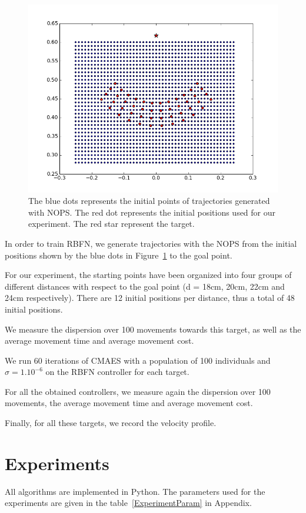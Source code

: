 \documentclass[pdftex,a4paper,11pt]{report}
\begin{document}
\begin{figure}
\centering
\includegraphics[scale=0.5]{figures/NOPStrainingPoint.png}
\caption{The blue dots represents the initial points of trajectories generated with NOPS. The red dot represents the initial positions used for our experiment. The red star represent the target.}
\label{fig:trainingPointForRBFN}
\end{figure}

In order to train RBFN, we generate trajectories with the NOPS from the initial positions shown by the blue dots in Figure~\ref{fig:trainingPointForRBFN} to the goal point.

For our experiment, the starting points have been organized into four groups of different distances with respect to the goal point (d = 18cm, 20cm, 22cm and 24cm respectively). There are 12 initial positions per distance, thus a total of 48 initial positions.

We measure the dispersion over 100 movements towards this target, as well as the average movement time and average movement cost.

We run 60 iterations of CMAES with a population of 100 individuals and $\sigma = 1.10^{-6}$ on the RBFN controller for each target.

For all the obtained controllers, we measure again the dispersion over 100 movements, the average movement time and average movement cost.

Finally, for all these targets, we record the velocity profile.

\section{Experiments}
All algorithms are implemented in Python. The parameters used for the experiments are given in the table~\ref{ExperimentParam} in Appendix.
\end{document}
